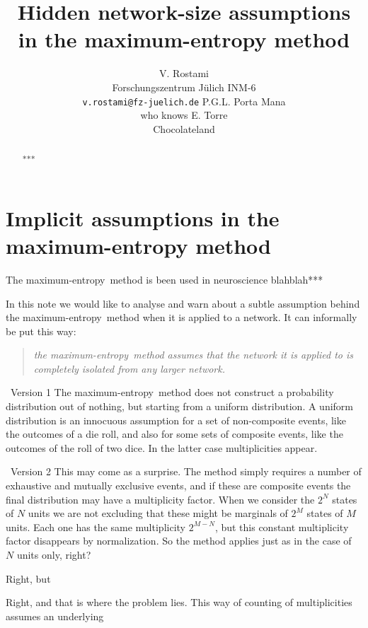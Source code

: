 \documentclass{article}
\title{Hidden network-size assumptions\\in the maximum-entropy method}
\author{ V. Rostami\\
  Forschungszentrum Jülich INM-6\\
  \texttt{v.rostami@fz-juelich.de}
  \And
  P.G.L. Porta Mana\\who knows
  \And E. Torre\\Chocolateland
}
\newcommand*{\mynote}[1]{ {\color[RGB]{68,170,153}\maltese\ #1}}
\newcommand*{\yN}{N}
\newcommand*{\yM}{M}
\newcommand*{\me}{maximum-entropy}
\begin{document}

\maketitle

\begin{abstract}
***%
\end{abstract}

\section{Implicit assumptions in the maximum-entropy method}

The \me\ method is been used in neuroscience blahblah***

In this note we would like to analyse and warn about a subtle assumption
behind the \me\ method when it is applied to a network. It can informally
be put this way:
\begin{quote}
  \emph{the \me\ method assumes that the network it is applied to is
    completely isolated from any larger network.}
\end{quote}

\mynote{Version 1}
The \me\ method does not construct a probability distribution out of
nothing, but starting from a uniform distribution. A uniform distribution
is an innocuous assumption for a set of non-composite events, like the
outcomes of a die roll, and also for some sets of composite events, like
the outcomes of the roll of two dice. In the latter case multiplicities
appear.

\mynote{Version 2}
This may come as a surprise. The method simply requires a number of
exhaustive and mutually exclusive events, and if these are composite events
the final distribution may have a multiplicity factor. When we consider the
$2^{\yN}$ states of $\yN$ units we are not excluding that these might be
marginals of $2^{\yM}$ states of $\yM$ units. Each one has the same
multiplicity $2^{\yM-\yN}$, but this constant multiplicity factor disappears
by normalization. So the method applies just as in the case of $\yN$ units
only, right?

Right, but 

Right, and that is where the problem lies. This way of counting of
multiplicities assumes an underlying 
\end{document}
